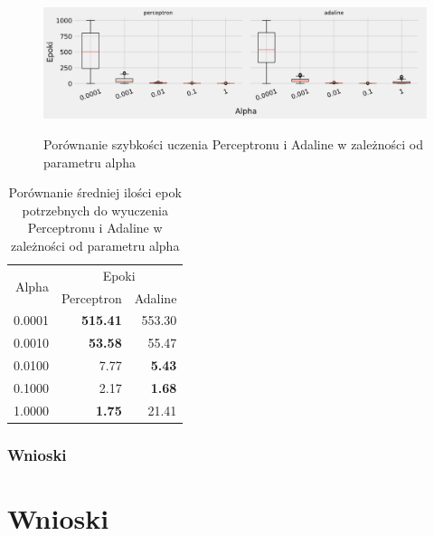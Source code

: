 \documentclass{article}
\begin{document}
\begin{figure}[h]
	\centering
	\caption{Porównanie szybkości uczenia Perceptronu i Adaline w zależności od parametru alpha}
	\includegraphics[width=\textwidth]{ada_per_alpha.png}
	\label{fig:res82}
\end{figure}

\begin{table}[h]
	\caption{Porównanie średniej ilości epok potrzebnych do wyuczenia Perceptronu i Adaline w zależności od parametru alpha}
	\label{tabela-res-82}
	\centering
	\begin{tabular}{rrr}
		\toprule
		\multirow{2}{*}{Alpha}   & \multicolumn{2}{c}{Epoki} \\
		       & Perceptron      & Adaline       \\
		\midrule
		0.0001 & \textbf{515.41} & 553.30        \\
		0.0010 & \textbf{53.58}  & 55.47         \\
		0.0100 & 7.77            & \textbf{5.43} \\
		0.1000 & 2.17            & \textbf{1.68} \\
		1.0000 & \textbf{1.75}   & 21.41         \\
		\bottomrule
	\end{tabular}
\end{table}

\subsubsection*{Wnioski}

\newpage
\section{Wnioski}
\end{document}
